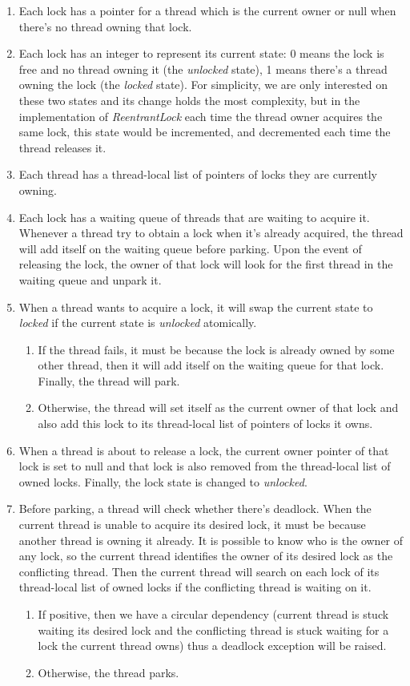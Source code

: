 \begin{enumerate}
\item Each lock has a pointer for a thread which is the current owner or null when there's no thread owning that lock.
\item Each lock has an integer to represent its current state: 0 means the lock is free and no thread owning it (the \emph{unlocked} state), 1 means there's a thread owning the lock (the \emph{locked} state). For simplicity, we are only interested on these two states and its change holds the most complexity, but in the implementation of \emph{ReentrantLock} each time the thread owner acquires the same lock, this state would be incremented, and decremented each time the thread releases it.
\item Each thread has a thread-local list of pointers of locks they are currently owning.
\item Each lock has a waiting queue of threads that are waiting to acquire it. Whenever a thread try to obtain a lock when it's already acquired, the thread will add itself on the waiting queue before parking. Upon the event of releasing the lock, the owner of that lock will look for the first thread in the waiting queue and unpark it.
\item When a thread wants to acquire a lock, it will swap the current state to \emph{locked} if the current state is \emph{unlocked} atomically.
\begin{enumerate}
\item If the thread fails, it must be because the lock is already owned by some other thread, then it will add itself on the waiting queue for that lock. Finally, the thread will park.
\item Otherwise, the thread will set itself as the current owner of that lock and also add this lock to its thread-local list of pointers of locks it owns.
\end{enumerate}
\item When a thread is about to release a lock, the current owner pointer of that lock is set to null and that lock is also removed from the thread-local list of owned locks. Finally, the lock state is changed to \emph{unlocked}.
\item Before parking, a thread will check whether there's deadlock. When the current thread is unable to acquire its desired lock, it must be because another thread is owning it already. It is possible to know who is the owner of any lock, so the current thread identifies the owner of its desired lock as the conflicting thread. Then the current thread will search on each lock of its thread-local list of owned locks if the conflicting thread is waiting on it.
\begin{enumerate}
\item If positive, then we have a circular dependency (current thread is stuck waiting its desired lock and the conflicting thread is stuck waiting for a lock the current thread owns) thus a deadlock exception will be raised.
\item Otherwise, the thread parks.
\end{enumerate}
\end{enumerate}

